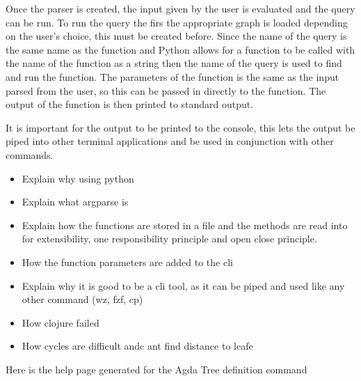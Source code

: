 Once the parser is created, the input given by the user is evaluated and the
query can be run. To run the query the firs the appropriate graph is loaded
depending on the user's choice, this must be created before. Since the name of
the query is the same name as the function and Python allows for a function to
be called with the name of the function as a string then the name of the query
is used to find and run the function. The parameters of the function is the
same as the input parsed from the user, so this can be passed in directly to
the function. The output of the function is then printed to standard output.

It is important for the output to be printed to the console, this lets the
output be piped into other terminal applications and be used in conjunction
with other commands.

\begin{itemize}
\item Explain why using python
\item Explain what argparse is 
\item Explain how the functions are stored in a file and the methods are read into for extensibility, one responsibility principle and open close principle.
\item How the function parameters are added to the cli 
\item Explain why it is good to be a cli tool, as it can be piped and used like any other command (wz, fzf, cp) 
\item How clojure failed 
\item How cycles are difficult andc ant find distance to leafe 
\end{itemize}


Here is the help page generated for the Agda Tree definition command

